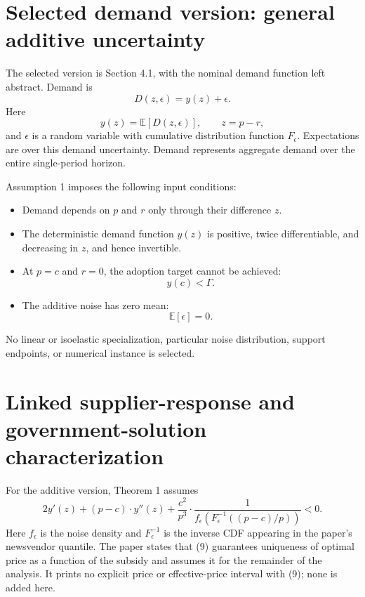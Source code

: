 \documentclass{article}
\begin{document}
\section*{Selected demand version: general additive uncertainty}
The selected version is Section 4.1, with the nominal demand function left abstract. Demand is
\begin{equation}
D(z,\epsilon)=y(z)+\epsilon.
\tag{8}
\end{equation}
Here
\[
y(z)=\mathbb{E}[D(z,\epsilon)],
\qquad z=p-r,
\]
and $\epsilon$ is a random variable with cumulative distribution function $F_\epsilon$. Expectations are over this demand uncertainty. Demand represents aggregate demand over the entire single-period horizon.

Assumption 1 imposes the following input conditions:
\begin{itemize}
\item Demand depends on $p$ and $r$ only through their difference $z$.
\item The deterministic demand function $y(z)$ is positive, twice differentiable, and decreasing in $z$, and hence invertible.
\item At $p=c$ and $r=0$, the adoption target cannot be achieved:
\[
y(c)<\Gamma.
\]
\item The additive noise has zero mean:
\[
\mathbb{E}[\epsilon]=0.
\]
\end{itemize}
No linear or isoelastic specialization, particular noise distribution, support endpoints, or numerical instance is selected.

\section*{Linked supplier-response and government-solution characterization}
For the additive version, Theorem 1 assumes
\begin{equation}
2y'(z)+(p-c)\cdot y''(z)
+\frac{c^2}{p^3}\cdot
\frac{1}{f_\epsilon\!\left(F_\epsilon^{-1}\!\left((p-c)/p\right)\right)}<0.
\tag{9}
\end{equation}
Here $f_\epsilon$ is the noise density and $F_\epsilon^{-1}$ is the inverse CDF appearing in the paper's newsvendor quantile. The paper states that (9) guarantees uniqueness of optimal price as a function of the subsidy and assumes it for the remainder of the analysis. It prints no explicit price or effective-price interval with (9); none is added here.
\end{document}
